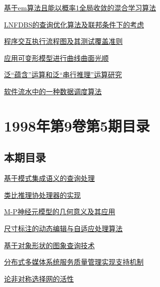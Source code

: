 \documentclass[a4paper]{article}
\begin{document}
\href{http://www.jos.org.cn/ch/reader/download_pdf.aspx?file_no=19980610&year_id=1998&quarter_id=6&falg=1}{基于em算法且能以概率1全局收敛的混合学习算法}

\href{http://www.jos.org.cn/ch/reader/download_pdf.aspx?file_no=19980611&year_id=1998&quarter_id=6&falg=1}{LNFDBS的查询优化算法及联邦条件下的考虑}

\href{http://www.jos.org.cn/ch/reader/download_pdf.aspx?file_no=19980612&year_id=1998&quarter_id=6&falg=1}{程序交互执行流程图及其测试覆盖准则}

\href{http://www.jos.org.cn/ch/reader/download_pdf.aspx?file_no=19980613&year_id=1998&quarter_id=6&falg=1}{应用可变形模型进行曲线曲面光顺}

\href{http://www.jos.org.cn/ch/reader/download_pdf.aspx?file_no=19980614&year_id=1998&quarter_id=6&falg=1}{泛“蕴含”运算和泛“串行推理”运算研究}

\href{http://www.jos.org.cn/ch/reader/download_pdf.aspx?file_no=19980615&year_id=1998&quarter_id=6&falg=1}{软件流水中的一种数据调度算法}


\section{\textbf{1998年第9卷第5期目录}}
\subsection{本期目录}
\href{http://www.jos.org.cn/ch/reader/download_pdf.aspx?file_no=19980501&year_id=1998&quarter_id=5&falg=1}{基于模式集成语义的查询处理}

\href{http://www.jos.org.cn/ch/reader/download_pdf.aspx?file_no=19980502&year_id=1998&quarter_id=5&falg=1}{类比推理协处理器的实现}

\href{http://www.jos.org.cn/ch/reader/download_pdf.aspx?file_no=19980503&year_id=1998&quarter_id=5&falg=1}{M-P神经元模型的几何意义及其应用}

\href{http://www.jos.org.cn/ch/reader/download_pdf.aspx?file_no=19980504&year_id=1998&quarter_id=5&falg=1}{尺寸标注的动态编辑与自适应处理算法}

\href{http://www.jos.org.cn/ch/reader/download_pdf.aspx?file_no=19980505&year_id=1998&quarter_id=5&falg=1}{基于对象形状的图象查询技术}

\href{http://www.jos.org.cn/ch/reader/download_pdf.aspx?file_no=19980506&year_id=1998&quarter_id=5&falg=1}{分布式多媒体系统服务质量管理实现支持机制}

\href{http://www.jos.org.cn/ch/reader/download_pdf.aspx?file_no=19980507&year_id=1998&quarter_id=5&falg=1}{论非对称选择网的活性}
\end{document}
